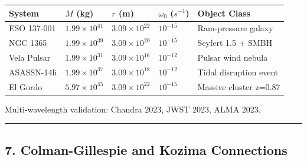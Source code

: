 \documentclass[
  11pt,
]{article}
\newcounter{none} %
\begin{document}
{\def\LTcaptype{none} %
\begin{longtable}[]{@{}
  >{\raggedright\arraybackslash}p{}
  >{\raggedright\arraybackslash}p{}
  >{\raggedright\arraybackslash}p{}
  >{\raggedright\arraybackslash}p{}
  >{\raggedright\arraybackslash}p{}@{}}
\toprule\noalign{}
\begin{minipage}[b]{\linewidth}\raggedright
System
\end{minipage} & \begin{minipage}[b]{\linewidth}\raggedright
\(M\) (kg)
\end{minipage} & \begin{minipage}[b]{\linewidth}\raggedright
\(r\) (m)
\end{minipage} & \begin{minipage}[b]{\linewidth}\raggedright
\(\omega_0\) (\(s^{-1}\))
\end{minipage} & \begin{minipage}[b]{\linewidth}\raggedright
Object Class
\end{minipage} \\
\midrule\noalign{}
\endhead
\bottomrule\noalign{}
\endlastfoot
ESO 137-001 & \(1.99\times10^{41}\) & \(3.09\times10^{22}\) &
\(10^{-15}\) & Ram-pressure galaxy \\
NGC 1365 & \(1.99\times10^{39}\) & \(3.09\times10^{20}\) & \(10^{-15}\)
& Seyfert 1.5 + SMBH \\
Vela Pulsar & \(1.99\times10^{31}\) & \(3.09\times10^{16}\) &
\(10^{-12}\) & Pulsar wind nebula \\
ASASSN-14li & \(1.99\times10^{37}\) & \(3.09\times10^{18}\) &
\(10^{-12}\) & Tidal disruption event \\
El Gordo & \(5.97\times10^{45}\) & \(3.09\times10^{22}\) & \(10^{-15}\)
& Massive cluster z=0.87 \\
\end{longtable}
}

Multi-wavelength validation: Chandra 2023, JWST 2023, ALMA 2023.

\begin{center}\rule{0.5\linewidth}{0.5pt}\end{center}

\subsection{7. Colman-Gillespie and Kozima
Connections}\label{colman-gillespie-and-kozima-connections}
\end{document}
